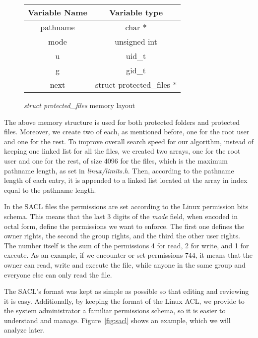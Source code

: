\begin{figure}[ht]
	\centering
	\begin{tabular}{|c|c|}
		\hline
		\textbf{Variable Name} & \textbf{Variable type} \\
		\hline
		pathname & char * \\
		\hline
		mode & unsigned int \\
		\hline
		u & uid\_t \\
		\hline
		g & gid\_t \\
		\hline
		next & struct protected\_files * \\
		\hline
	\end{tabular}
	\caption{\textit{struct protected\_files} memory layout}
	\label{fig:sacl_layout}
\end{figure}

\par The above memory structure is used for both protected folders and protected files. Moreover, we create two of each, as mentioned before, one for the root user and one for the rest. To improve overall search speed for our algorithm, instead of keeping one linked list for all the files, we created two arrays, one for the root user and one for the rest, of size 4096 for the files, which is the maximum pathname length, as set in \textit{linux/limits.h}. Then, according to the pathname length of each entry, it is appended to a linked list located at the array in index equal to the pathname length. 

\par In the \ac{SACL} files the permissions are set according to the Linux permission bits schema. This means that the last 3 digits of the \textit{mode} field, when encoded in octal form, define the permissions we want to enforce. The first one defines the owner rights, the second the group rights, and the third the other user rights. The number itself is the sum of the permissions 4 for read, 2 for write, and 1 for execute. As an example, if we encounter or set permissions 744, it means that the owner can read, write and execute the file, while anyone in the same group and everyone else can only read the file.

\par The \ac{SACL}'s format was kept as simple as possible so that editing and reviewing it is easy. Additionally, by keeping the format of the Linux \ac{ACL}, we provide to the system administrator a familiar permissions schema, so it is easier to understand and manage. Figure~\ref{fig:sacl} shows an example, which we will analyze later.

